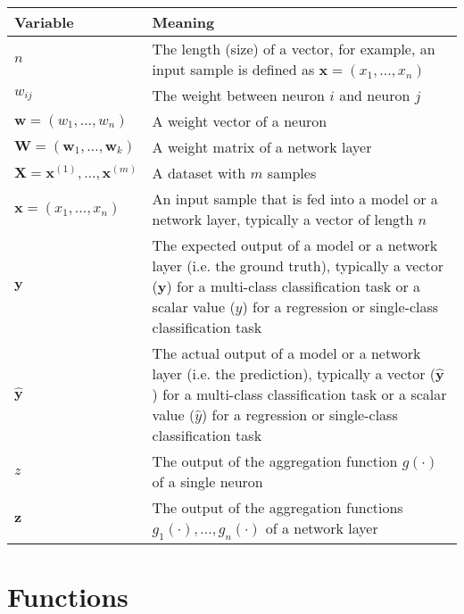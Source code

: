 \begin{tabular}{ p{3cm} p{11cm} }
	\textbf{Variable} & \textbf{Meaning}\\
	\hline
	$n$ & The length (size) of a vector, for example, an input sample is defined as $\boldsymbol{x} = (x_1, ..., x_n)$\\
	$w_{ij}$ & The weight between neuron $i$ and neuron $j$\\
	$\boldsymbol{w} = (w_1, ..., w_n)$ & A weight vector of a neuron\\
	$\boldsymbol{W} = (\boldsymbol{w}_1, ..., \boldsymbol{w}_k)$ & A weight matrix of a network layer\\
	$\boldsymbol{X} = \boldsymbol{x}^{(1)}, ..., \boldsymbol{x}^{(m)}$ & A dataset with $m$ samples\\
	$\boldsymbol{x} = (x_1, ..., x_n)$ & An input sample that is fed into a model or a network layer, typically a vector of length $n$\\
	$\boldsymbol{y}$ & The expected output of a model or a network layer (i.e. the ground truth), typically a vector ($\boldsymbol{y}$) for a multi-class classification task or a scalar value ($y$) for a regression or single-class classification task\\
	$\boldsymbol{\hat{y}}$ & The actual output of a model or a network layer (i.e. the prediction), typically a vector ($\boldsymbol{\hat{y}}$) for a multi-class classification task or a scalar value ($\hat{y}$) for a regression or single-class classification task\\
	$z$ & The output of the aggregation function $g(\cdot)$ of a single neuron\\
	$\boldsymbol{z}$ & The output of the aggregation functions $g_1(\cdot), ..., g_n(\cdot)$ of a network layer\\
\end{tabular}


\section{Functions}

